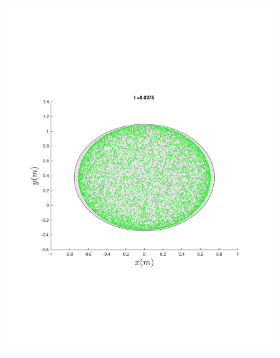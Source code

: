 \begin{figure}
{\begin{subfigure}{0.5\textwidth}
\begin{subfigure}[b]{0.5\textwidth}
        \includegraphics[trim={1cm 7cm 1cm 7cm},
        width=\textwidth]{figures/method/FunnelSimOverlaid6funnel-1}
      \end{subfigure}%
      \begin{subfigure}[b]{0.5\textwidth}

\end{subfigure}
\end{subfigure}}
\end{figure}
